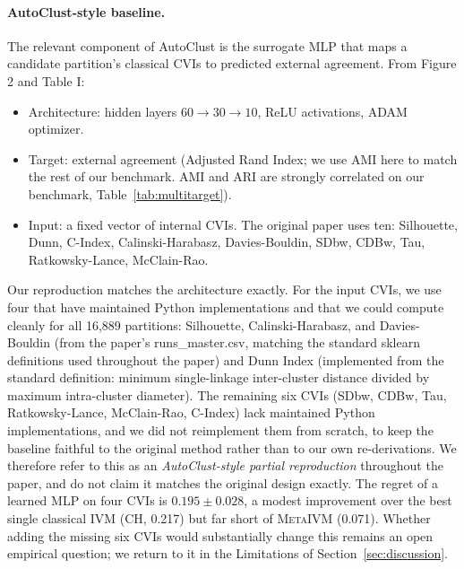\documentclass[10pt]{article} %
\newcommand{\ours}{\textsc{MetaIVM}}
\begin{document}
\paragraph{AutoClust-style baseline.} The relevant component of AutoClust is the surrogate MLP that maps a candidate partition's classical CVIs to predicted external agreement. From \citet{poulakis2020autoclust} Figure 2 and Table I:
\begin{itemize}
    \item Architecture: hidden layers $60 \to 30 \to 10$, ReLU activations, ADAM optimizer.
    \item Target: external agreement (Adjusted Rand Index; we use AMI here to match the rest of our benchmark. AMI and ARI are strongly correlated on our benchmark, Table~\ref{tab:multitarget}).
    \item Input: a fixed vector of internal CVIs. The original paper uses ten: Silhouette, Dunn, C-Index, Calinski-Harabasz, Davies-Bouldin, SDbw, CDBw, Tau, Ratkowsky-Lance, McClain-Rao.
\end{itemize}
Our reproduction matches the architecture exactly. For the input CVIs, we use four that have maintained Python implementations and that we could compute cleanly for all 16,889 partitions: Silhouette, Calinski-Harabasz, and Davies-Bouldin (from the paper's runs\_master.csv, matching the standard sklearn definitions used throughout the paper) and Dunn Index (implemented from the standard definition: minimum single-linkage inter-cluster distance divided by maximum intra-cluster diameter). The remaining six CVIs (SDbw, CDBw, Tau, Ratkowsky-Lance, McClain-Rao, C-Index) lack maintained Python implementations, and we did not reimplement them from scratch, to keep the baseline faithful to the original method rather than to our own re-derivations. We therefore refer to this as an \emph{AutoClust-style partial reproduction} throughout the paper, and do not claim it matches the original design exactly. The regret of a learned MLP on four CVIs is $0.195 \pm 0.028$, a modest improvement over the best single classical IVM (CH, 0.217) but far short of \ours{} (0.071). Whether adding the missing six CVIs would substantially change this remains an open empirical question; we return to it in the Limitations of Section~\ref{sec:discussion}.
\end{document}
